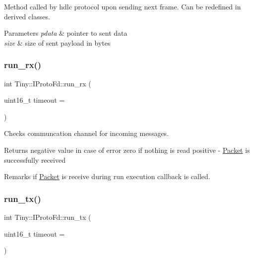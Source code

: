 Method called by hdlc protocol upon sending next frame. Can be redefined in derived classes. 
\begin{DoxyParams}{Parameters}
{\em pdata} & pointer to sent data \\
\hline
{\em size} & size of sent payload in bytes \\
\hline
\end{DoxyParams}
\mbox{\label{classTiny_1_1IProtoFd_a37292eb5c9faf1be8c4850985e0ae2eb}} 
\subsubsection{\texorpdfstring{run\+\_\+rx()}{run\_rx()}}
{\footnotesize\ttfamily int Tiny\+::\+I\+Proto\+Fd\+::run\+\_\+rx (\begin{DoxyParamCaption}\item[{uint16\+\_\+t}]{timeout = {} }\end{DoxyParamCaption})}

Checks communcation channel for incoming messages. \begin{DoxyReturn}{Returns}
negative value in case of error zero if nothing is read positive -\/ \hyperlink{classTiny_1_1Packet}{Packet} is successfully received 
\end{DoxyReturn}
\begin{DoxyRemark}{Remarks}
if \hyperlink{classTiny_1_1Packet}{Packet} is receive during run execution callback is called. 
\end{DoxyRemark}
\mbox{\label{classTiny_1_1IProtoFd_a19be0bd5124009c7de051554841070b3}} 
\subsubsection{\texorpdfstring{run\+\_\+tx()}{run\_tx()}}
{\footnotesize\ttfamily int Tiny\+::\+I\+Proto\+Fd\+::run\+\_\+tx (\begin{DoxyParamCaption}\item[{uint16\+\_\+t}]{timeout = {} }\end{DoxyParamCaption})}

